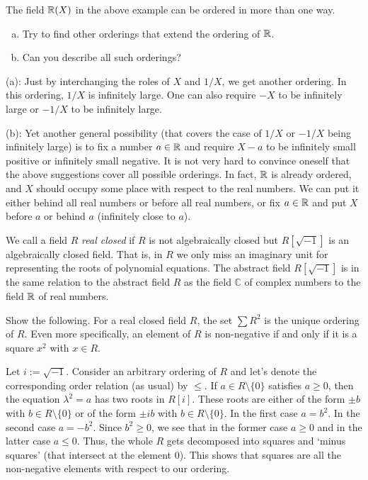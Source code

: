 \begin{exercise}
	\label{exer:all:orderings:rational:functions}
	The field $\mathbb{R}(X)$ in the above example can be ordered in more than one way. 
	\begin{enumerate}[(a)]
		\item Try to find other orderings that extend the ordering of $\mathbb{R}$. 
		\item Can you describe all such orderings? 
	\end{enumerate}
\end{exercise}
\begin{solution}
	(a): Just by interchanging the roles of $X$ and $1/X$, we get another ordering. In this ordering, $1/X$ is infinitely large. One can also require $-X$ to be infinitely large or $-1/X$ to be infinitely large. 
	
	(b): Yet another general possibility (that covers the case of $1/X$ or $-1/X$ being infinitely large) is to fix a number $a \in \mathbb{R}$ and require $X-a$ to be infinitely small positive or infinitely small negative. It is not very hard to convince oneself that the above suggestions cover all possible orderings. In fact, $\mathbb{R}$ is already ordered, and $X$ should occupy some place with respect to the real numbers. We can put it either behind all real numbers or before all real numbers, or fix $a \in \mathbb{R}$ and put $X$ before $a$ or behind $a$ (infinitely close to $a$). 
\end{solution}

We call a field $R$ \emph{real closed} if $R$ is not algebraically closed but $R[\sqrt{-1}]$ is an algebraically closed field. That is, in $R$ we only miss an imaginary unit for representing the roots of polynomial equations. The abstract field $R[\sqrt{-1}]$ is in the same relation to the abstract field $R$ as the field $\mathbb{C}$ of complex numbers to the field $\mathbb{R}$ of real numbers. 

\begin{exercise}
Show the following. For a real closed field $R$, the set  $\sum R^2$ is the unique ordering of $R$. Even more specifically, an element of $R$ is non-negative  if and only if it is a square $x^2$ with $x \in R$. 
\end{exercise}
\begin{solution}
	Let $i:= \sqrt{-1}$. Consider an arbitrary ordering of $R$ and let's denote the corresponding order relation (as usual) by $\le$. If $a \in R \setminus \{0\}$ satisfies $a \ge 0$,
	then the equation $\lambda^2 = a$ has two roots in $R[i]$. These roots are either of the form $\pm b$ with $b \in R \setminus \{0\}$ or of the form $\pm i b$ with $b \in R \setminus \{0\}$. In the first case $a = b^2$. In the second case $a = - b^2$. Since $b^2 \ge 0$, we see that in the former case $a \ge 0$ and in the latter case $a \le 0$. Thus, the whole $R$ gets decomposed into squares and `minus squares' (that intersect at the element $0$). This shows that squares are all the non-negative elements with respect to our ordering. 
\end{solution}

